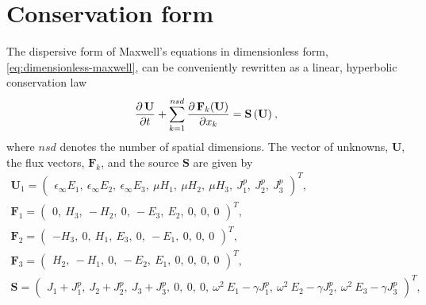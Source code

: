 \section{Conservation form}

The dispersive form of Maxwell's equations in dimensionless form, \eqref{eq:dimensionless-maxwell}, can be conveniently rewritten as a linear, hyperbolic conservation law \cite{Godlewski:2013tj,LeVeque:2002vc}
\begin{equation}
\frac{\partial  \, \mathbf{U}}{\partial t} + \sum_{k=1}^{nsd} \frac { \partial \, \mathbf{F}_k(\mathbf{U}) }{ \partial x_k } = \mathbf{S}\,(\mathbf{U}) \: ,
\label{maxwell-curl-equations-conservation-form}
\end{equation}
where $nsd$ denotes the number of spatial dimensions. The vector of unknowns, $\mathbf{U}$, the flux vectors, $\mathbf{F}_k$, and the source $\mathbf{S}$ are given by
\begin{equation*}
\begin{array}{c}
\mathbf{U}_1 =
  \begin{pmatrix}
    \epsilon_{\infty} E_1, \:
    \epsilon_{\infty} E_2 , \:
    \epsilon_{\infty} E_3 , \:
    \mu H_1 , \:
    \mu H_2 , \:
    \mu H_3 , \:
    J^p_1 , \:
    J^p_2 , \:
    J^p_3
\end{pmatrix}^T,
\\
\mathbf{F}_1 =
  \begin{pmatrix}
    0 ,\:
    H_3 ,\:
    -H_2 ,\:
    0 ,\:
    -E_3 ,\:
    E_2 ,\:
    0 ,\:
    0 ,\:
    0
  \end{pmatrix}^T , \\

\mathbf{F}_2 =
  \begin{pmatrix}
    - H_3 ,\:
    0 ,\:
    H_1 ,\:
    E_3 ,\:
    0 ,\:
    -E_1 ,\:
    0 ,\:
     0 ,\:
    0
  \end{pmatrix}^T , \\

\mathbf{F}_3 =
  \begin{pmatrix}
    H_2 ,\:
    -H_1 ,\:
    0 ,\:
    -E_2 ,\:
    E_1 ,\:
    0 ,\:
    0 ,\:
    0 ,\:
    0
  \end{pmatrix}^T , \\

\mathbf{S} =
  \begin{pmatrix}
    J_1 + J^p_1 ,\:
    J_2 + J^p_2 ,\:
    J_3 + J^p_3 ,\:
    0 ,\:
    0 ,\:
    0 ,\:
    \omega^2 \: E_1 - \gamma J^p_1 ,\:
    \omega^2 \: E_2 - \gamma J^p_2 ,\:
    \omega^2 \: E_3 - \gamma J^p_3
  \end{pmatrix}^T,

\end{array}
\end{equation*}

